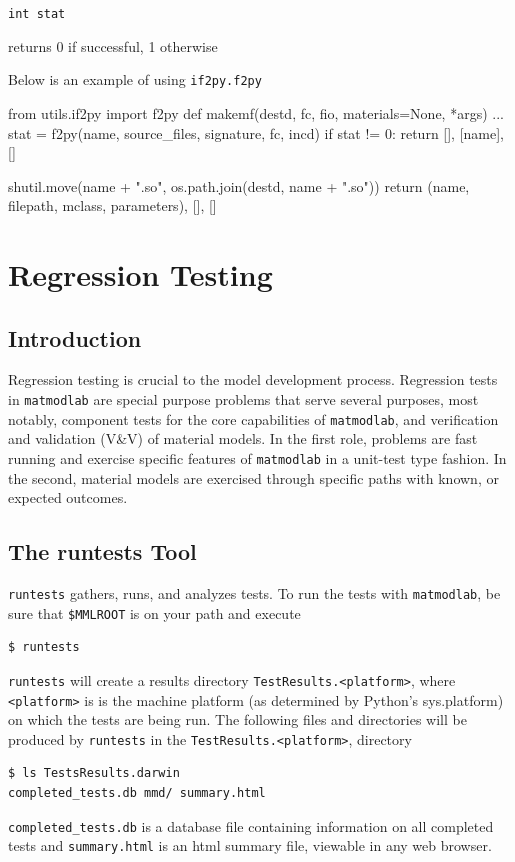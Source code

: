 \documentclass[12pt,report,strict]{SANDreport/SANDreport}
\newenvironment{example}%
   {\par\noindent\adjustbox{margin=1ex,bgcolor=shadecolor,margin=0ex
       \medskipamount}\bgroup\minipage\textwidth\verbatim}%
   {\endverbatim\endminipage\egroup}
\newcommand{\param}[2]{\noindent\texttt{#1}%
  \begin{adjustwidth}{2.5em}{0pt}#2\end{adjustwidth}}
\newcommand{\vnv}{V\&V}
\newcommand{\mml}{\texttt{matmodlab}}
\newcommand{\runtests}{\texttt{runtests}}
\begin{document}
\param{int stat}{returns 0 if successful, 1 otherwise}

Below is an example of using \texttt{if2py.f2py}
\begin{example}
from utils.if2py import f2py
def makemf(destd, fc, fio, materials=None, *args)
    ...
    stat = f2py(name, source_files, signature, fc, incd)
    if stat != 0:
        return [], [name], []

    shutil.move(name + ".so", os.path.join(destd, name + ".so"))
    return (name, filepath, mclass, parameters), [], []
\end{example}



\chapter{Regression Testing}
\label{chap:rtest}

\section{Introduction}
\label{sec:rtest-intro}
Regression testing is crucial to the model development process. Regression
tests in \mml{} are special purpose problems that serve several purposes, most
notably, component tests for the core capabilities of \mml{}, and verification
and validation (\vnv{}) of material models. In the first role, problems are
fast running and exercise specific features of \mml{} in a unit-test type
fashion. In the second, material models are exercised through specific paths
with known, or expected outcomes.

\section{The runtests Tool}
\label{sec:rtest-run}
\runtests{} gathers, runs, and analyzes tests. To run the tests with
\mml{}, be sure that \verb|$MMLROOT| is on your path and execute

\begin{verbatim}
$ runtests
\end{verbatim}

\runtests{} will create a results directory \verb|TestResults.<platform>|,
where \texttt{<platform>} is is the machine platform (as determined by
Python's sys.platform) on which the tests are being run. The following files
and directories will be produced by \runtests{} in the
\verb|TestResults.<platform>|, directory
\begin{verbatim}
$ ls TestsResults.darwin
completed_tests.db mmd/ summary.html
\end{verbatim}
%
\texttt{completed\_tests.db} is a database file containing information on all
completed tests and \texttt{summary.html} is an html summary file, viewable in
any web browser.
\end{document}
